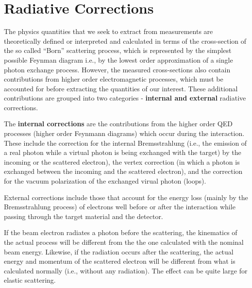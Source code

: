 \pagebreak   %
\section{Radiative Corrections}
The physics quantities that we seek to extract from measurements are theoretically defined or interpreted and calculated in terms of the cross-section of the so called ``Born'' scattering process, which is represented by the simplest possible Feynman diagram i.e., by the lowest order approximation of a single photon exchange process. However, the measured cross-sections also contain contributions from 
higher order electromagnetic processes, %
which must be accounted for %
before extracting the quantities of our interest. These additional contributions are grouped into two categories - {\bf internal and external} radiative corrections. 

The {\bf internal corrections} are the contributions from the higher order QED processes (higher order Feynmann diagrams) which occur during the interaction. %
These include the correction for the internal Bremsstrahlung (i.e., the emission of a real photon while a virtual photon is being exchanged with the target) by the incoming or the scattered electron), the vertex correction (in which a photon is exchanged between the incoming and the scattered electron), and the correction for the vacuum polarization of the exchanged virual photon (\epems loops). 

External %
corrections include those that account for the energy loss (mainly by the Bremsstrahlung process) of electrons well before or after the interaction while passing through the target material and the detector. %

If the beam electron radiates a photon before the scattering, the kinematics of the actual process will be different from the the one calculated with the nominal beam energy. Likewise, if the radiation occurs after the scattering, the actual energy and momentum of the scattered electron will be different from what is calculated normally (i.e., without any radiation). The effect %
can be quite large for elastic scattering. 

